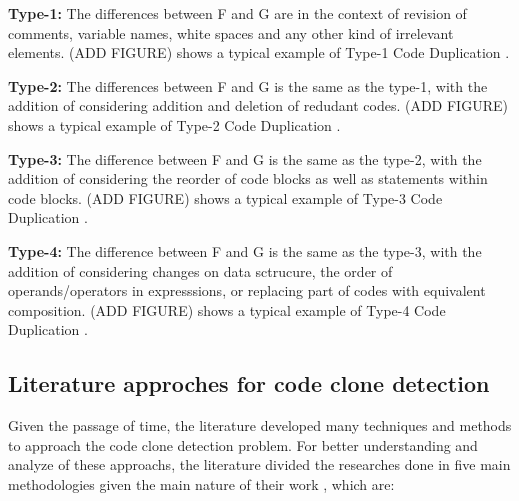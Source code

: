 \begin{itemize}
	\begin{item}
		\textbf{Type-1:} The differences between F and G are in the context of revision of comments, variable names, white spaces 
		and any other kind of irrelevant elements. (ADD FIGURE) shows a typical example of Type-1 Code 
		Duplication \citep{litreview}. 
	\end{item}
	\begin{item}
		\textbf{Type-2:} The differences between F and G is the same as the type-1, with the addition of considering 
		addition and deletion of redudant codes. (ADD FIGURE) shows a typical example of Type-2 Code Duplication \citep{litreview}. 
	\end{item}
	\begin{item}
		\textbf{Type-3:} The difference between F and G is the same as the type-2, with the addition of considering 
		the reorder of code blocks as well as statements within code blocks. (ADD FIGURE) shows a typical example of 
		Type-3 Code Duplication \citep{litreview}. 
	\end{item}
	\begin{item}
		\textbf{Type-4:} The difference between F and G is the same as the type-3, with the addition of considering 
		changes on data sctrucure, the order of operands/operators in expresssions, or replacing part of codes with 
		equivalent composition. (ADD FIGURE) shows a typical example of Type-4 Code Duplication \citep{litreview}. 
	\end{item}



\end{itemize}

\subsection{Literature approches for code clone detection}

Given the passage of time, the literature developed many techniques and methods to approach the code clone detection problem. 
For better understanding and analyze of these approachs, the literature divided the researches done in
five main methodologies given the main nature of their work \citep{litreview} , which are:

